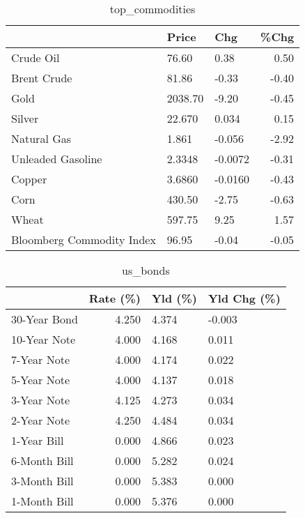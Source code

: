 \documentclass{article}%
\begin{document}
\begin{table}[htbp]%
\caption{top\_commodities}%
\centering%
\begin{adjustbox}{width=1\textwidth}%
\begin{tabular}{lllr}
\toprule
                          &   Price &     Chg &  \%Chg \\
\midrule
               Crude Oil  &   76.60 &    0.38 &  0.50 \\
             Brent Crude  &   81.86 &   -0.33 & -0.40 \\
                    Gold  & 2038.70 &   -9.20 & -0.45 \\
                  Silver  &  22.670 &   0.034 &  0.15 \\
             Natural Gas  &   1.861 &  -0.056 & -2.92 \\
       Unleaded Gasoline  &  2.3348 & -0.0072 & -0.31 \\
                  Copper  &  3.6860 & -0.0160 & -0.43 \\
                    Corn  &  430.50 &   -2.75 & -0.63 \\
                   Wheat  &  597.75 &    9.25 &  1.57 \\
Bloomberg Commodity Index &   96.95 &   -0.04 & -0.05 \\
\bottomrule
\end{tabular}
%
\end{adjustbox}%
\end{table}

%


\begin{table}[htbp]%
\caption{us\_bonds}%
\centering%
\begin{adjustbox}{width=1\textwidth}%
\begin{tabular}{lrll}
\toprule
             &  Rate (\%) & Yld (\%) & Yld Chg (\%) \\
\midrule
30-Year Bond &     4.250 &   4.374 &      -0.003 \\
10-Year Note &     4.000 &   4.168 &       0.011 \\
 7-Year Note &     4.000 &   4.174 &       0.022 \\
 5-Year Note &     4.000 &   4.137 &       0.018 \\
 3-Year Note &     4.125 &   4.273 &       0.034 \\
 2-Year Note &     4.250 &   4.484 &       0.034 \\
 1-Year Bill &     0.000 &   4.866 &       0.023 \\
6-Month Bill &     0.000 &   5.282 &       0.024 \\
3-Month Bill &     0.000 &   5.383 &       0.000 \\
1-Month Bill &     0.000 &   5.376 &       0.000 \\
\bottomrule
\end{tabular}
%
\end{adjustbox}%
\end{table}
\end{document}
